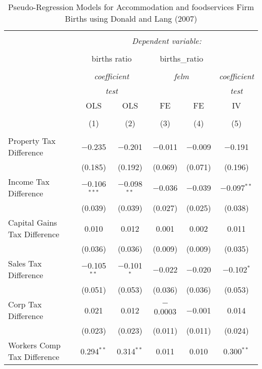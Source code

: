 
\begin{table}[!htbp] \centering 
  \caption{Pseudo-Regression Models for  Accommodation and foodservices Firm Births using Donald and Lang (2007)} 
  \label{} 
\begin{tabular}{@{\extracolsep{5pt}}lccccc} 
\\[-1.8ex]\hline 
\hline \\[-1.8ex] 
 & \multicolumn{5}{c}{\textit{Dependent variable:}} \\ 
\cline{2-6} 
\\[-1.8ex] & \multicolumn{2}{c}{births ratio} & \multicolumn{2}{c}{births\_ratio} &   \\ 
\\[-1.8ex] & \multicolumn{2}{c}{\textit{coefficient}} & \multicolumn{2}{c}{\textit{felm}} & \textit{coefficient} \\ 
 & \multicolumn{2}{c}{\textit{test}} & \multicolumn{2}{c}{\textit{}} & \textit{test} \\ 
 & OLS & OLS & FE & FE & IV \\ 
\\[-1.8ex] & (1) & (2) & (3) & (4) & (5)\\ 
\hline \\[-1.8ex] 
 Property Tax Difference & $-$0.235 & $-$0.201 & $-$0.011 & $-$0.009 & $-$0.191 \\ 
  & (0.185) & (0.192) & (0.069) & (0.071) & (0.196) \\ 
  Income Tax Difference & $-$0.106$^{***}$ & $-$0.098$^{**}$ & $-$0.036 & $-$0.039 & $-$0.097$^{**}$ \\ 
  & (0.039) & (0.039) & (0.027) & (0.025) & (0.038) \\ 
  Capital Gains Tax Difference & 0.010 & 0.012 & 0.001 & 0.002 & 0.011 \\ 
  & (0.036) & (0.036) & (0.009) & (0.009) & (0.035) \\ 
  Sales Tax Difference & $-$0.105$^{**}$ & $-$0.101$^{*}$ & $-$0.022 & $-$0.020 & $-$0.102$^{*}$ \\ 
  & (0.051) & (0.053) & (0.036) & (0.036) & (0.053) \\ 
  Corp Tax Difference & 0.021 & 0.012 & $-$0.0003 & $-$0.001 & 0.014 \\ 
  & (0.023) & (0.023) & (0.011) & (0.011) & (0.024) \\ 
  Workers Comp Tax Difference & 0.294$^{**}$ & 0.314$^{**}$ & 0.011 & 0.010 & 0.300$^{**}$ \\ 

\end{tabular}
\end{table}
